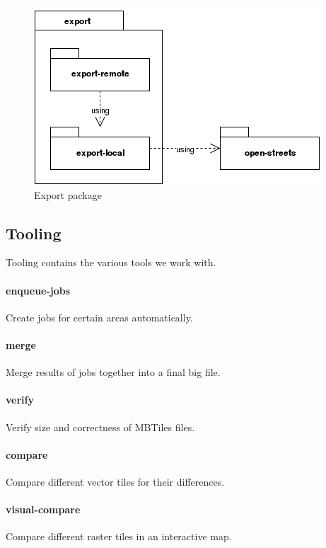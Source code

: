 \begin{figure}[h]
  \includegraphics[scale=0.6]{images/export_package.png}
  \caption{Export package}
\end{figure}
\newpage

\newpage
\subsection{Tooling}

Tooling contains the various tools we work with.

\paragraph{enqueue-jobs}
Create jobs for certain areas automatically.

\paragraph{merge}
Merge results of jobs together into a final big file.

\paragraph{verify}
Verify size and correctness of MBTiles files.

\paragraph{compare}
Compare different vector tiles for their differences.

\paragraph{visual-compare}
Compare different raster tiles in an interactive map.

